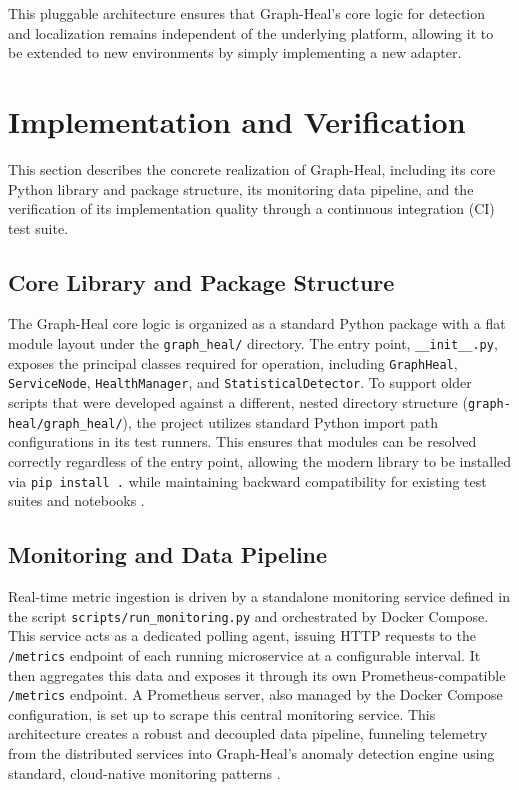 \documentclass[11pt,conference]{IEEEtran}
\begin{document}
This pluggable architecture ensures that Graph-Heal's core logic for detection and localization remains independent of the underlying platform, allowing it to be extended to new environments by simply implementing a new adapter.



\section{Implementation and Verification}
\label{sec:implementation}

This section describes the concrete realization of Graph-Heal, including its core Python library and package structure, its monitoring data pipeline, and the verification of its implementation quality through a continuous integration (CI) test suite.

\subsection{Core Library and Package Structure}
\label{sec:core-library}

The Graph-Heal core logic is organized as a standard Python package with a flat module layout under the \texttt{graph\_heal/} directory. The entry point, \texttt{\_\_init\_\_.py}, exposes the principal classes required for operation, including \texttt{GraphHeal}, \texttt{ServiceNode}, \texttt{HealthManager}, and \texttt{StatisticalDetector}. To support older scripts that were developed against a different, nested directory structure (\texttt{graph-heal/graph\_heal/}), the project utilizes standard Python import path configurations in its test runners. This ensures that modules can be resolved correctly regardless of the entry point, allowing the modern library to be installed via \texttt{pip install .} while maintaining backward compatibility for existing test suites and notebooks \cite{code1}.

\subsection{Monitoring and Data Pipeline}
\label{sec:prometheus-monitor}

Real-time metric ingestion is driven by a standalone monitoring service defined in the script \texttt{scripts/run\_monitoring.py} and orchestrated by Docker Compose. This service acts as a dedicated polling agent, issuing HTTP requests to the \texttt{/metrics} endpoint of each running microservice at a configurable interval. It then aggregates this data and exposes it through its own Prometheus-compatible \texttt{/metrics} endpoint. A Prometheus server, also managed by the Docker Compose configuration, is set up to scrape this central monitoring service. This architecture creates a robust and decoupled data pipeline, funneling telemetry from the distributed services into Graph-Heal's anomaly detection engine using standard, cloud-native monitoring patterns \cite{code2}.
\end{document}
